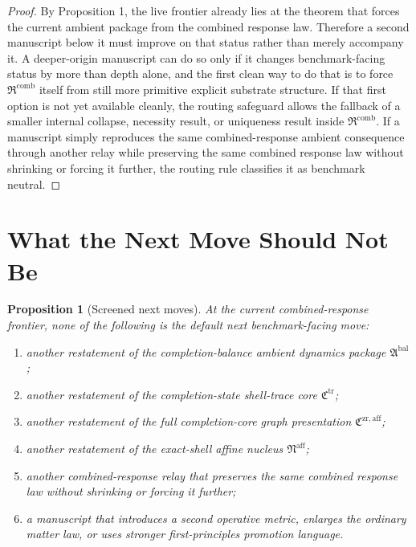\documentclass[11pt]{article}
\newcommand{\CompletionCore}{\mathfrak C^{\mathrm{zr,aff}}}
\newcommand{\TraceCore}{\mathfrak C^{\mathrm{tr}}}
\newcommand{\AffineNucleus}{\mathfrak N^{\mathrm{aff}}}
\newcommand{\AmbientPackage}{\mathfrak A^{\mathrm{bal}}}
\newcommand{\CombinedLaw}{\mathfrak R^{\mathrm{comb}}}
\newtheorem{proposition}{Proposition}
\begin{document}
\begin{proof}
By Proposition 1, the live frontier already lies at the theorem that forces the current ambient package from the combined response law. Therefore a second manuscript below it must improve on that status rather than merely accompany it. A deeper-origin manuscript can do so only if it changes benchmark-facing status by more than depth alone, and the first clean way to do that is to force \(\CombinedLaw\) itself from still more primitive explicit substrate structure. If that first option is not yet available cleanly, the routing safeguard allows the fallback of a smaller internal collapse, necessity result, or uniqueness result inside \(\CombinedLaw\). If a manuscript simply reproduces the same combined-response ambient consequence through another relay while preserving the same combined response law without shrinking or forcing it further, the routing rule classifies it as benchmark neutral.
\end{proof}

\section{What the Next Move Should Not Be}

\begin{proposition}[Screened next moves]
At the current combined-response frontier, none of the following is the default next benchmark-facing move:
\begin{enumerate}
    \item another restatement of the completion-balance ambient dynamics package \(\AmbientPackage\);
    \item another restatement of the completion-state shell-trace core \(\TraceCore\);
    \item another restatement of the full completion-core graph presentation \(\CompletionCore\);
    \item another restatement of the exact-shell affine nucleus \(\AffineNucleus\);
    \item another combined-response relay that preserves the same combined response law without shrinking or forcing it further;
    \item a manuscript that introduces a second operative metric, enlarges the ordinary matter law, or uses stronger first-principles promotion language.
\end{enumerate}
\end{proposition}
\end{document}
